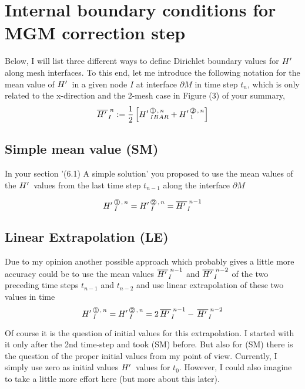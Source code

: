 \section{Internal boundary conditions for MGM correction step}


Below, I will list three different ways to define Dirichlet boundary values for ${H'\,}$ along mesh interfaces.
To this end, let me introduce the following notation for the mean value of ${H'\,}$ in a given node $I$  
at interface $\partial M$ in time step $t_n$, which is only related to the x-direction and the 2-mesh case in Figure (3) of your summary,
\begin{equation}
\label{BC-MEAN}
\HLO{I}{n}:=  \frac{1}{2} \left[  \HL{IBAR}{1}{n}  +  \HL{1}{2}{n} \right] 
\end{equation}


\subsection{Simple mean value (SM)} 
In your section '(6.1) A simple solution'  you proposed to use the mean values of the ${H'\,}$ values  from the last time step $t_{n-1}$
along the interface $\partial M$

\begin{equation}
\label{BC-SM}
\HL{I}{1}{n} = \HL{I}{2}{n} = \HLO{I}{n-1}  
\end{equation}

\subsection{Linear Extrapolation (LE)}

Due to my opinion another possible approach which probably gives a little more accuracy could be to use the mean values 
$\overline{{H'\,}}_{I}^{\;{n-1}}$ and $\overline{{H'\,}}_{I}^{\;{n-2}}$ of the two preceding time steps $t_{n-1}$ and $t_{n-2}$
and use linear extrapolation of these two values in time 
\begin{equation}
\label{BC-LE}
\HL{I}{1}{n} = \HL{I}{2}{n} =  2 \,\HLO{I}{n-1} - \, \HLO{I}{n-2}
\end{equation}
  
Of course it is the question of initial values for this extrapolation. I started with it only after the 2nd time-step and took (SM) before. 
But also for (SM) there is the question of the proper initial values from my point of view. Currently, I simply use zero as initial values ${H'\,}$ values for $t_0$. However, I could also imagine to take a little more effort here (but more about this later).

